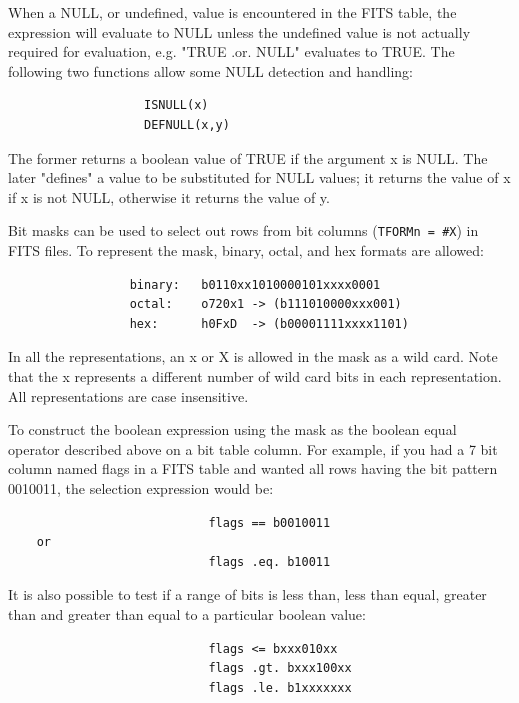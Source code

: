 \documentclass[11pt]{article}
\begin{document}
When  a  NULL, or undefined, value is encountered in the FITS table,
the expression will evaluate to NULL unless the undefined  value  is
not   actually   required  for  evaluation,  e.g. "TRUE  .or.  NULL"
evaluates to TRUE. The  following  two  functions  allow  some  NULL
detection  and  handling:

\begin{verbatim}
                   ISNULL(x)
                   DEFNULL(x,y)
\end{verbatim}

The former returns a boolean value of TRUE if the  argument  x  is
NULL.   The later  "defines"  a  value  to  be  substituted  for NULL
values; it returns the value of x if x is not NULL, otherwise  it
returns  the value of y.

Bit  masks can be used to select out rows from bit columns ({\tt TFORMn =
\#X}) in FITS files. To represent the mask,  binary,  octal,  and  hex
formats are allowed:

\begin{verbatim}
                 binary:   b0110xx1010000101xxxx0001
                 octal:    o720x1 -> (b111010000xxx001)
                 hex:      h0FxD  -> (b00001111xxxx1101)
\end{verbatim}

In  all  the  representations, an x or X is allowed in the mask as a
wild card. Note that the x represents a  different  number  of  wild
card  bits  in  each  representation.  All  representations are case
insensitive.

To construct the boolean expression using the mask  as  the  boolean
equal  operator  described above on a bit table column. For example,
if you had a 7 bit column named flags in a  FITS  table  and  wanted
all  rows  having  the bit pattern 0010011, the selection expression
would be:


\begin{verbatim}
                            flags == b0010011
    or
                            flags .eq. b10011
\end{verbatim}

It is also possible to test if a range of bits is  less  than,  less
than  equal,  greater  than  and  greater than equal to a particular
boolean value:


\begin{verbatim}
                            flags <= bxxx010xx
                            flags .gt. bxxx100xx
                            flags .le. b1xxxxxxx
\end{verbatim}
\end{document}
